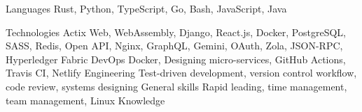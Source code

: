 
\begin{cvskills}
  \cvskill
    {Languages} %
    {Rust, Python, TypeScript, Go, Bash, JavaScript, Java} %

  \cvskill
    {Technologies} %
    {Actix Web, WebAssembly, Django, React.js, Docker, PostgreSQL, SASS, Redis, Open API, Nginx, GraphQL, Gemini, OAuth, Zola, JSON-RPC, Hyperledger Fabric} %
  \cvskill
    {DevOps}
    {Docker, Designing micro-services, GitHub Actions, Travis CI, Netlify}
  \cvskill
    {Engineering}
    {Test-driven development, version control workflow, code review, systems designing}
  \cvskill
    {General skills}
    {Rapid leading, time management, team management, Linux Knowledge}
\end{cvskills}
